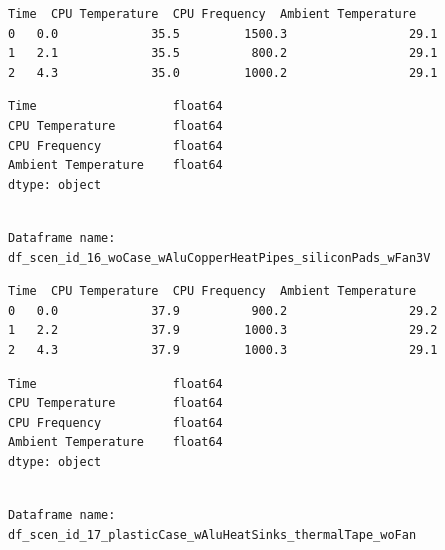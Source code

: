 \documentclass[10pt,parskip=half,
toc=sectionentrywithdots,
bibliography=totocnumbered,
captions=tableheading,numbers=noendperiod]{scrartcl}
\begin{document}
\begin{lstlisting}[language={},postbreak={},numbers=none,xrightmargin=7pt,breakindent=0pt,aboveskip=5pt,belowskip=5pt]
   Time  CPU Temperature  CPU Frequency  Ambient Temperature
0   0.0             35.5         1500.3                 29.1
1   2.1             35.5          800.2                 29.1
2   4.3             35.0         1000.2                 29.1
\end{lstlisting}

\begin{lstlisting}[language={},postbreak={},numbers=none,xrightmargin=7pt,breakindent=0pt,aboveskip=5pt,belowskip=5pt]
Time                   float64
CPU Temperature        float64
CPU Frequency          float64
Ambient Temperature    float64
dtype: object
\end{lstlisting}

\begin{lstlisting}[language={},postbreak={},numbers=none,xrightmargin=7pt,belowskip=5pt,aboveskip=5pt,breakindent=0pt]

Dataframe name: df_scen_id_16_woCase_wAluCopperHeatPipes_siliconPads_wFan3V

\end{lstlisting}

\begin{lstlisting}[language={},postbreak={},numbers=none,xrightmargin=7pt,breakindent=0pt,aboveskip=5pt,belowskip=5pt]
   Time  CPU Temperature  CPU Frequency  Ambient Temperature
0   0.0             37.9          900.2                 29.2
1   2.2             37.9         1000.3                 29.2
2   4.3             37.9         1000.3                 29.1
\end{lstlisting}

\begin{lstlisting}[language={},postbreak={},numbers=none,xrightmargin=7pt,breakindent=0pt,aboveskip=5pt,belowskip=5pt]
Time                   float64
CPU Temperature        float64
CPU Frequency          float64
Ambient Temperature    float64
dtype: object
\end{lstlisting}

\begin{lstlisting}[language={},postbreak={},numbers=none,xrightmargin=7pt,belowskip=5pt,aboveskip=5pt,breakindent=0pt]

Dataframe name: df_scen_id_17_plasticCase_wAluHeatSinks_thermalTape_woFan

\end{lstlisting}
\end{document}
